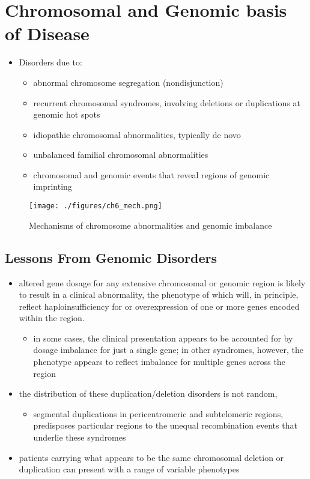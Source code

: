 \documentclass[12pt]{scrartcl}
\begin{document}
\section{Chromosomal and Genomic basis of Disease}
\label{sec:org79385b9}
\begin{itemize}
\item Disorders due to:
\begin{itemize}
\item abnormal chromosome segregation (nondisjunction)
\item recurrent chromosomal syndromes, involving
deletions or duplications at genomic hot spots
\item idiopathic chromosomal abnormalities, typically de novo
\item unbalanced familial chromosomal abnormalities
\item chromosomal and genomic events that reveal regions
of genomic imprinting
\end{itemize}
\end{itemize}

\begin{figure}[htbp]
\centering
\texttt{[image: ./figures/ch6\_mech.png]}
\caption{\label{fig:org40d2db5}Mechanisms of chromosome abnormalities and genomic imbalance}
\end{figure}

\subsection{Lessons From Genomic Disorders}
\label{sec:org75727f0}
\begin{itemize}
\item altered gene dosage for any extensive chromosomal or genomic region
is likely to result in a clinical abnormality, the phenotype of
which will, in principle, reflect haploinsufficiency for or
overexpression of one or more genes encoded within the region.
\begin{itemize}
\item in some cases, the clinical presentation appears to be accounted
for by dosage imbalance for just a single gene; in other
syndromes, however, the phenotype appears to reflect imbalance for
multiple genes across the region
\end{itemize}
\item the distribution of these duplication/deletion disorders is not random,
\begin{itemize}
\item segmental duplications in pericentromeric and subtelomeric
regions, predisposes particular regions to the unequal
recombination events that underlie these syndromes
\end{itemize}
\item patients carrying what appears to be the same chromosomal deletion
or duplication can present with a range of variable phenotypes
\end{itemize}
\end{document}

